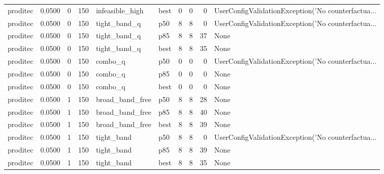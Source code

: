 \begin{tabular}{lrrrllrrrl}
proditec &    0.0500 &    0 &    150 &      infeasible\_high &   best &               0 &          0 &       0 & UserConfigValidationException('No counterfactua... \\
proditec &    0.0500 &    0 &    150 &         tight\_band\_q &    p50 &               8 &          8 &       0 & UserConfigValidationException('No counterfactua... \\
proditec &    0.0500 &    0 &    150 &         tight\_band\_q &    p85 &               8 &          8 &      37 &                                               None \\
proditec &    0.0500 &    0 &    150 &         tight\_band\_q &   best &               8 &          8 &      35 &                                               None \\
proditec &    0.0500 &    0 &    150 &              combo\_q &    p50 &               0 &          0 &       0 & UserConfigValidationException('No counterfactua... \\
proditec &    0.0500 &    0 &    150 &              combo\_q &    p85 &               0 &          0 &       0 &                                               None \\
proditec &    0.0500 &    0 &    150 &              combo\_q &   best &               0 &          0 &       0 &                                               None \\
proditec &    0.0500 &    1 &    150 &      broad\_band\_free &    p50 &               8 &          8 &      28 &                                               None \\
proditec &    0.0500 &    1 &    150 &      broad\_band\_free &    p85 &               8 &          8 &      40 &                                               None \\
proditec &    0.0500 &    1 &    150 &      broad\_band\_free &   best &               8 &          8 &      39 &                                               None \\
proditec &    0.0500 &    1 &    150 &           tight\_band &    p50 &               8 &          8 &       0 & UserConfigValidationException('No counterfactua... \\
proditec &    0.0500 &    1 &    150 &           tight\_band &    p85 &               8 &          8 &      39 &                                               None \\
proditec &    0.0500 &    1 &    150 &           tight\_band &   best &               8 &          8 &      35 &                                               None \\

\end{tabular}
